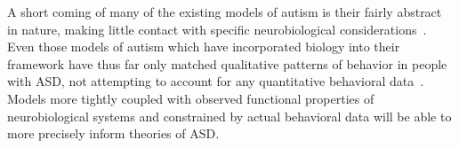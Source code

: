 A short coming of many of the existing models of autism is their fairly abstract in nature, making little contact with specific neurobiological considerations~\cite{CohenIL:1994:AutismLearning,McClellandJL:2000:Autism,OLoughlinC:2000:Coherence}.  Even those models of autism which have incorporated biology into their framework have thus far only matched qualitative patterns of behavior in people with ASD, not attempting to account for any quantitative behavioral data~\cite{GustafssonL:1997:AutismMaps,RefWorks:146}.  Models more tightly coupled with observed functional properties of neurobiological systems and constrained by actual behavioral data will be able to more precisely inform theories of ASD. 




